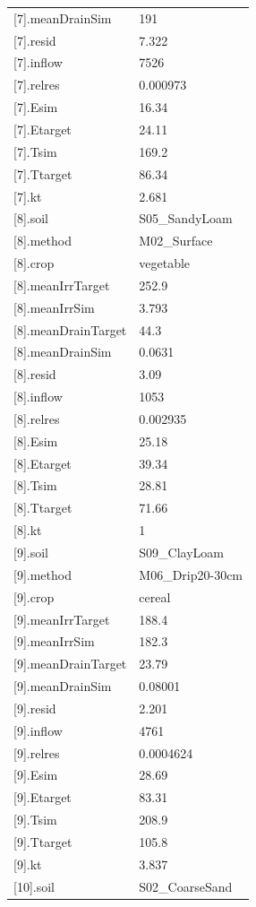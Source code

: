 {\begin{longtable}{p{}p{}}
{}[7].meanDrainSim & 191\\
{}[7].resid & 7.322\\
{}[7].inflow & 7526\\
{}[7].relres & 0.000973\\
{}[7].Esim & 16.34\\
{}[7].Etarget & 24.11\\
{}[7].Tsim & 169.2\\
{}[7].Ttarget & 86.34\\
{}[7].kt & 2.681\\
{}[8].soil & S05\_SandyLoam\\
{}[8].method & M02\_Surface\\
{}[8].crop & vegetable\\
{}[8].meanIrrTarget & 252.9\\
{}[8].meanIrrSim & 3.793\\
{}[8].meanDrainTarget & 44.3\\
{}[8].meanDrainSim & 0.0631\\
{}[8].resid & 3.09\\
{}[8].inflow & 1053\\
{}[8].relres & 0.002935\\
{}[8].Esim & 25.18\\
{}[8].Etarget & 39.34\\
{}[8].Tsim & 28.81\\
{}[8].Ttarget & 71.66\\
{}[8].kt & 1\\
{}[9].soil & S09\_ClayLoam\\
{}[9].method & M06\_Drip20-30cm\\
{}[9].crop & cereal\\
{}[9].meanIrrTarget & 188.4\\
{}[9].meanIrrSim & 182.3\\
{}[9].meanDrainTarget & 23.79\\
{}[9].meanDrainSim & 0.08001\\
{}[9].resid & 2.201\\
{}[9].inflow & 4761\\
{}[9].relres & 0.0004624\\
{}[9].Esim & 28.69\\
{}[9].Etarget & 83.31\\
{}[9].Tsim & 208.9\\
{}[9].Ttarget & 105.8\\
{}[9].kt & 3.837\\
{}[10].soil & S02\_CoarseSand\\

\end{longtable}}
